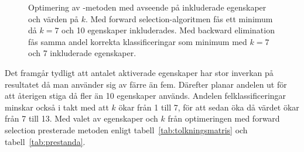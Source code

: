 \documentclass[../rapport_MVEX01-11-05]{subfiles}
\begin{document}
\begin{figure}[tbp]
    \begin{center}
    \end{center}
    \caption{Optimering av \knn-metoden med avseende på inkluderade egenskaper
och värden på $k$. Med forward selection-algoritmen fås ett minimum då
$k=7$ och 10 egenskaper inkluderades. Med backward elimination fås
samma andel korrekta klassificeringar som minimum med $k=7$ och 7 inkluderade egenskaper.}
    \label{fig:knn-optimering}
\end{figure}

Det framgår tydligt att antalet aktiverade egenskaper har stor
inverkan på resultatet då man använder sig av färre än
fem. Därefter planar andelen ut för att återigen stiga då
fler än 10 egenskaper används. Andelen felklassificeringar
minskar också i takt med att $k$ ökar från 1 till 7, för att sedan
öka då värdet ökar från 7 till 13. Med valet av egenskaper och $k$ från
optimeringen med forward selection presterade metoden enligt
tabell~\vref{tab:tolkningsmatris} och tabell~\vref{tab:prestanda}.

\end{document}
